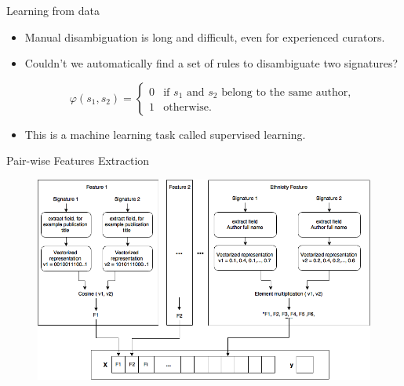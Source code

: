 \documentclass{beamer}
\begin{document}
\begin{frame}{Learning from data}

\begin{itemize}
\item Manual disambiguation is {\color{red} long and difficult}, even for experienced curators.\\[2em]
\item Couldn't we {\color{blue} automatically find a set of rules} to disambiguate two signatures?

$$\varphi(s_1, s_2) = \begin{cases}
    0 & \text{if $s_1$ and $s_2$ belong to the same author},\\
    1 & \text{otherwise}.
  \end{cases}$$

\item This is a machine learning task called {\color{red}supervised learning}.
\end{itemize}

\end{frame}




\begin{frame}{Pair-wise Features Extraction}

\begin{figure}
   \centering
   \includegraphics[width=\textwidth]{./figures/pairwise_features.png}
\end{figure}

\end{frame}


\end{document}
